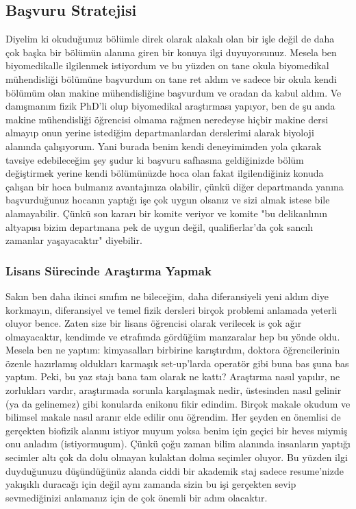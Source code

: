 \documentclass[12pt,a4paper]{article}
\begin{document}
\subsection{Başvuru Stratejisi}
Diyelim ki okuduğunuz bölümle direk olarak alakalı olan bir işle değil de daha çok başka bir bölümün alanına giren bir konuya ilgi duyuyorsunuz. Mesela ben biyomedikalle ilgilenmek istiyordum ve bu yüzden on tane okula biyomedikal mühendisliği bölümüne başvurdum on tane ret aldım ve sadece bir okula kendi bölümüm olan makine mühendisliğine başvurdum ve oradan da kabul aldım. Ve danışmanım fizik PhD’li olup biyomedikal araştırması yapıyor, ben de şu anda makine mühendisliği öğrencisi olmama rağmen nere\-deyse hiçbir makine dersi almayıp onun yerine istediğim departmanlardan derslerimi alarak biyoloji alanında çalışıyorum. Yani burada benim kendi deneyimimden yola çıkarak tavsiye edebileceğim şey şudur ki başvuru safha\-sına geldiğinizde bölüm değiştirmek yerine kendi bölümünüzde hoca olan fakat ilgilendiğiniz konuda çalışan bir hoca bulmanız avantajınıza olabilir, çünkü diğer departmanda yanına başvurduğunuz hocanın yaptığı işe çok uygun olsanız ve sizi almak istese bile alamayabilir. Çünkü son kararı bir komite veriyor ve komite "bu delikanlının altyapısı bizim departmana pek de uygun değil, qualifierlar’da çok sancılı zamanlar yaşayacaktır" diyebilir.

\subsubsection{Lisans Sürecinde Araştırma Yapmak}
Sakın ben daha ikinci sınıfım ne bileceğim, daha diferansiyeli yeni aldım diye korkmayın, diferansiyel ve temel fizik dersleri birçok problemi anlamada yeterli oluyor bence. Zaten size bir lisans öğrencisi olarak verilecek is çok ağır olmayacaktır, kendimde ve etrafımda gördüğüm manzaralar hep bu yönde oldu. Mesela ben ne yaptım: kimyasalları birbirine karıştırdım, doktora öğrencilerinin özenle hazırlamış oldukları karmaşık set-up’larda operatör gibi buna bas şuna bas yaptım. Peki, bu yaz stajı bana tam olarak ne kattı? Araştırma nasıl yapılır, ne zorlukları vardır, araştırmada sorunla karşılaşmak nedir, üstesinden nasıl gelinir (ya da gelinemez) gibi konularda enikonu fikir edindim. Birçok makale okudum ve bilimsel makale nasıl aranır elde edilir onu öğrendim. Her şeyden en önemlisi de gerçekten biofizik alanını istiyor muyum yoksa benim için geçici bir heves miymiş onu anladım (istiyormuşum). Çünkü çoğu zaman bilim alanında insanların yaptığı secimler altı çok da dolu olmayan kulaktan dolma seçimler oluyor. Bu yüzden ilgi duyduğunuzu düşündüğünüz alanda ciddi bir akademik staj sadece resume'nizde yakışıklı duracağı için değil aynı zamanda sizin bu işi gerçekten sevip sevmediğinizi anlamanız için de çok önemli bir adım olacaktır.
\end{document}

